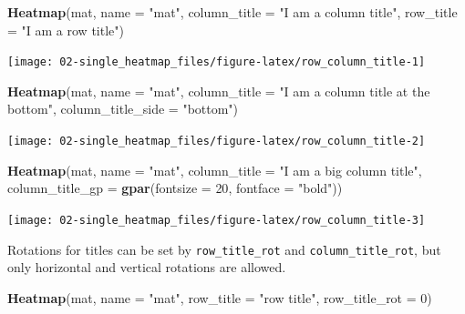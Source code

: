 \documentclass[]{book}
\newenvironment{Shaded}{\begin{snugshade}}{\end{snugshade}}
\newcommand{\KeywordTok}[1]{\textcolor[rgb]{0.13,0.29,0.53}{\textbf{#1}}}
\newcommand{\DataTypeTok}[1]{\textcolor[rgb]{0.13,0.29,0.53}{#1}}
\newcommand{\DecValTok}[1]{\textcolor[rgb]{0.00,0.00,0.81}{#1}}
\newcommand{\StringTok}[1]{\textcolor[rgb]{0.31,0.60,0.02}{#1}}
\newcommand{\NormalTok}[1]{#1}
\theoremstyle{definition}
\theoremstyle{definition}
\theoremstyle{definition}
\theoremstyle{remark}
\begin{document}
\begin{Shaded}
\begin{Highlighting}[]
\KeywordTok{Heatmap}\NormalTok{(mat, }\DataTypeTok{name =} \StringTok{"mat"}\NormalTok{, }\DataTypeTok{column_title =} \StringTok{"I am a column title"}\NormalTok{, }
    \DataTypeTok{row_title =} \StringTok{"I am a row title"}\NormalTok{)}
\end{Highlighting}
\end{Shaded}

\begin{center}\texttt{[image: 02-single\_heatmap\_files/figure-latex/row\_column\_title-1]} \end{center}

\begin{Shaded}
\begin{Highlighting}[]
\KeywordTok{Heatmap}\NormalTok{(mat, }\DataTypeTok{name =} \StringTok{"mat"}\NormalTok{, }\DataTypeTok{column_title =} \StringTok{"I am a column title at the bottom"}\NormalTok{, }
    \DataTypeTok{column_title_side =} \StringTok{"bottom"}\NormalTok{)}
\end{Highlighting}
\end{Shaded}

\begin{center}\texttt{[image: 02-single\_heatmap\_files/figure-latex/row\_column\_title-2]} \end{center}

\begin{Shaded}
\begin{Highlighting}[]
\KeywordTok{Heatmap}\NormalTok{(mat, }\DataTypeTok{name =} \StringTok{"mat"}\NormalTok{, }\DataTypeTok{column_title =} \StringTok{"I am a big column title"}\NormalTok{, }
    \DataTypeTok{column_title_gp =} \KeywordTok{gpar}\NormalTok{(}\DataTypeTok{fontsize =} \DecValTok{20}\NormalTok{, }\DataTypeTok{fontface =} \StringTok{"bold"}\NormalTok{))}
\end{Highlighting}
\end{Shaded}

\begin{center}\texttt{[image: 02-single\_heatmap\_files/figure-latex/row\_column\_title-3]} \end{center}

Rotations for titles can be set by \texttt{row\_title\_rot} and
\texttt{column\_title\_rot}, but only horizontal and vertical rotations
are allowed.

\begin{Shaded}
\begin{Highlighting}[]
\KeywordTok{Heatmap}\NormalTok{(mat, }\DataTypeTok{name =} \StringTok{"mat"}\NormalTok{, }\DataTypeTok{row_title =} \StringTok{"row title"}\NormalTok{, }\DataTypeTok{row_title_rot =} \DecValTok{0}\NormalTok{)}
\end{Highlighting}
\end{Shaded}
\end{document}
